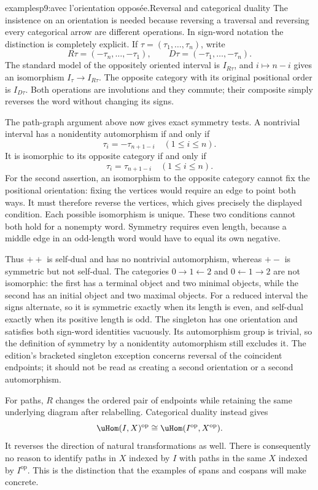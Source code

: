 \begin{dcomment}{examples}{p9:avec l'orientation opposée.}{Reversal and categorical duality}
The insistence on an orientation is needed because reversing a traversal and reversing every categorical arrow are different operations. In sign-word notation the distinction is completely explicit. If $\tau=(\tau_1,\ldots,\tau_n)$, write
\[
R\tau=(-\tau_n,\ldots,-\tau_1),\qquad
D\tau=(-\tau_1,\ldots,-\tau_n).
\]
The standard model of the oppositely oriented interval is $I_{R\tau}$, and $i\mapsto n-i$ gives an isomorphism $I_\tau\to I_{R\tau}$. The opposite category with its original positional order is $I_{D\tau}$. Both operations are involutions and they commute; their composite simply reverses the word without changing its signs.

The path-graph argument above now gives exact symmetry tests. A nontrivial interval has a nonidentity automorphism if and only if
\[
\tau_i=-\tau_{n+1-i}\quad(1\leq i\leq n).
\]
It is isomorphic to its opposite category if and only if
\[
\tau_i=\tau_{n+1-i}\quad(1\leq i\leq n).
\]
For the second assertion, an isomorphism to the opposite category cannot fix the positional orientation: fixing the vertices would require an edge to point both ways. It must therefore reverse the vertices, which gives precisely the displayed condition. Each possible isomorphism is unique. These two conditions cannot both hold for a nonempty word. Symmetry requires even length, because a middle edge in an odd-length word would have to equal its own negative.

Thus $++$ is self-dual and has no nontrivial automorphism, whereas $+-$ is symmetric but not self-dual. The categories $0\to1\leftarrow2$ and $0\leftarrow1\to2$ are not isomorphic: the first has a terminal object and two minimal objects, while the second has an initial object and two maximal objects. For a reduced interval the signs alternate, so it is symmetric exactly when its length is even, and self-dual exactly when its positive length is odd. The singleton has one orientation and satisfies both sign-word identities vacuously. Its automorphism group is trivial, so the definition of symmetry by a nonidentity automorphism still excludes it. The edition's bracketed singleton exception concerns reversal of the coincident endpoints; it should not be read as creating a second orientation or a second automorphism.

For paths, $R$ changes the ordered pair of endpoints while retaining the same underlying diagram after relabelling. Categorical duality instead gives
\[
\uHom(I,X)^{\mathrm{op}}\cong\uHom(I^{\mathrm{op}},X^{\mathrm{op}}).
\]
It reverses the direction of natural transformations as well. There is consequently no reason to identify paths in $X$ indexed by $I$ with paths in the same $X$ indexed by $I^{\mathrm{op}}$. This is the distinction that the examples of spans and cospans will make concrete.
\end{dcomment}

